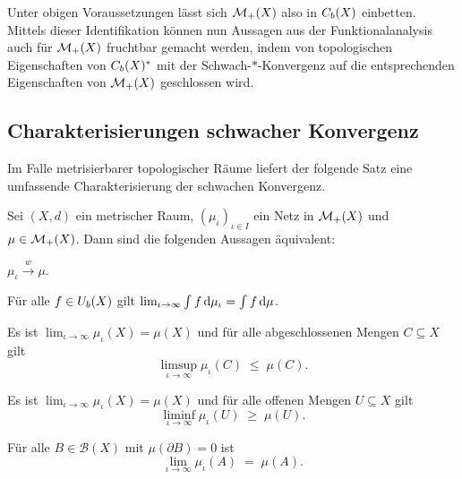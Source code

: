 \documentclass[../main/main.tex]{subfiles}
\begin{document}
	Unter obigen Voraussetzungen lässt sich $\mathcal{M}_{+}(X)$ also in $C_b(X)$ einbetten. Mittels dieser Identifikation können nun Aussagen aus der 
	Funktionalanalysis auch für $\mathcal{M}_{+}(X)$ fruchtbar gemacht werden, indem von topologischen Eigenschaften von
	$C_b(X)^\ast$ mit der Schwach-$\ast$-Konvergenz auf die entsprechenden Eigenschaften von 
	$\mathcal{M}_{+}(X)$ geschlossen wird. 
	
	\subsection{Charakterisierungen schwacher Konvergenz}
	
	Im Falle metrisierbarer topologischer Räume liefert der folgende Satz eine umfassende Charakterisierung der schwachen Konvergenz.
	
	\begin{Satz}[Portmanteau]
		\label{thm:portmanteau}
		Sei $(X, d)$ ein metrischer Raum, $(\mu_\iota)_{\iota \in I}$ ein Netz in $\mathcal{M}_{+}(X)$
		und $\mu \in \mathcal{M}_{+}(X)$. Dann sind die folgenden Aussagen äquivalent:
		\begin{equivalentthm}
			\item $\mu_\iota \xrightarrow{w} \mu$.
			\item Für alle $f \in U_b(X)$ gilt $\lim_{\iota \to \infty} \int_{} \, f \, \mathrm{d}\mu_\iota = \int_{} \, f \, \mathrm{d}\mu$.
			\item Es ist 
			$\lim_{\iota \to \infty} \mu_\iota(X) = \mu(X)$
			und für alle abgeschlossenen Mengen $C \subseteq X$ gilt 
			$$\limsup_{\iota \to \infty} \mu_\iota(C) \; \leq \; \mu(C) \text{.}$$
			\item Es ist 
			$\lim_{\iota \to \infty} \mu_\iota(X) = \mu(X)$
			und für alle offenen Mengen $U \subseteq X$ gilt 
			$$\liminf_{\iota \to \infty} \mu_\iota(U) \; \geq \; \mu(U) \text{.}$$
			\item Für alle $B \in \mathcal{B}(X)$ mit $\mu(\partial B) = 0$ 
			ist $$\lim_{\iota \to \infty} \mu_\iota(A) \; = \; \mu(A) \text{.}$$
		\end{equivalentthm}
	\end{Satz}
	
\end{document}
